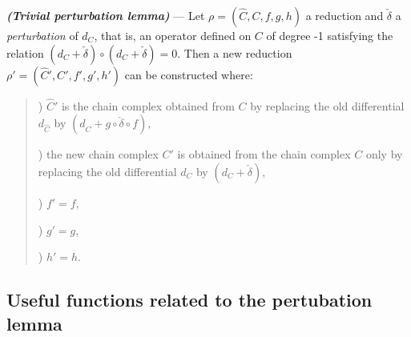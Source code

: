 \begin{thr}
{\em \bf (Trivial perturbation lemma)} --- Let
$\rho=(\hat{C},C,f,g,h)$ a reduction and ${\check\delta}$ a {\em perturbation} of
$d_C$, that is, an operator defined on $C$ of degree -1 satisfying
the relation $(d_C+{\check\delta})\circ (d_C+{\check\delta})=0$.
Then a new reduction $\rho'=(\hat{C}',C',f',g',h')$ can be constructed where:
\begin{quotation}

) $\hat{C}'$ is the chain complex obtained from $C$ by replacing the old
differential $d_{\hat{C}}$ by $(d_{\hat{C}}+ g \circ {\check\delta} \circ f),$

) the new chain complex $C'$ is obtained from the chain complex $C$ only by
replacing  the old differential $d_C$ by $(d_C +{\check \delta}),$ 

) $f'= f,$

) $g'= g,$

) $h'= h.$
\end{quotation}
\end{thr}

\subsection {Useful functions related to the pertubation lemma}

